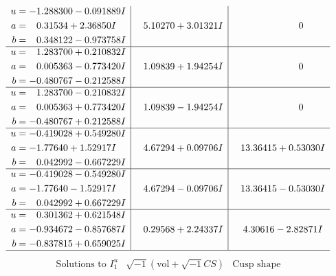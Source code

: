 \documentclass[1p]{elsarticle_modified}
\theoremstyle{definition}
\newcommand{\I}{\sqrt{-1}}
\begin{document}
$$\begin{array}{c|c|c}
\begin{aligned}
u &= -1.288300 - 0.091889 I \\
a &= \phantom{-}0.31534 + 2.36850 I \\
b &= \phantom{-}0.348122 - 0.973758 I\end{aligned}
 & \phantom{-}5.10270 + 3.01321 I & \phantom{-0.000000 } 0 \\ \hline\begin{aligned}
u &= \phantom{-}1.283700 + 0.210832 I \\
a &= \phantom{-}0.005363 - 0.773420 I \\
b &= -0.480767 - 0.212588 I\end{aligned}
 & \phantom{-}1.09839 + 1.94254 I & \phantom{-0.000000 } 0 \\ \hline\begin{aligned}
u &= \phantom{-}1.283700 - 0.210832 I \\
a &= \phantom{-}0.005363 + 0.773420 I \\
b &= -0.480767 + 0.212588 I\end{aligned}
 & \phantom{-}1.09839 - 1.94254 I & \phantom{-0.000000 } 0 \\ \hline\begin{aligned}
u &= -0.419028 + 0.549280 I \\
a &= -1.77640 + 1.52917 I \\
b &= \phantom{-}0.042992 - 0.667229 I\end{aligned}
 & \phantom{-}4.67294 + 0.09706 I & \phantom{-}13.36415 + 0.53030 I \\ \hline\begin{aligned}
u &= -0.419028 - 0.549280 I \\
a &= -1.77640 - 1.52917 I \\
b &= \phantom{-}0.042992 + 0.667229 I\end{aligned}
 & \phantom{-}4.67294 - 0.09706 I & \phantom{-}13.36415 - 0.53030 I \\ \hline\begin{aligned}
u &= \phantom{-}0.301362 + 0.621548 I \\
a &= -0.934672 - 0.857687 I \\
b &= -0.837815 + 0.659025 I\end{aligned}
 & \phantom{-}0.29568 + 2.24337 I & \phantom{-}4.30616 - 2.82871 I\\
 \hline 
 \end{array}$$\newpage$$\begin{array}{c|c|c}  
\text{Solutions to }I^u_{1}& \I (\text{vol} + \sqrt{-1}CS) & \text{Cusp shape}\\

\end{array}$$
\end{document}
